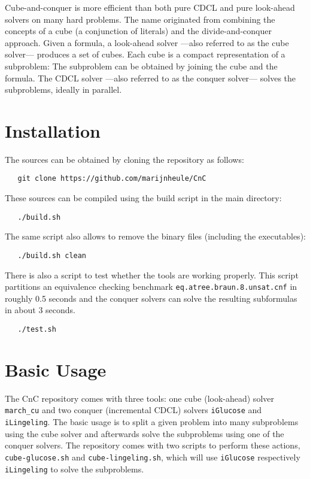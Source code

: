 \documentclass{llncs}
\begin{document}
Cube-and-conquer is more efficient than both pure CDCL and pure look-ahead solvers on many 
hard problems. The name originated from combining the concepts of a cube (a conjunction of literals) and the
divide-and-conquer approach. Given a formula, a look-ahead solver ---also referred to as the cube 
solver--- produces a set of cubes. Each cube is a compact representation of a subproblem:
The subproblem can be obtained by joining the cube and the  formula. The CDCL solver ---also 
referred to as the conquer solver--- solves the subproblems, ideally in parallel.


\section{Installation}

The sources can be obtained by cloning the repository as follows:

\begin{verbatim}
   git clone https://github.com/marijnheule/CnC
\end{verbatim}

\noindent
These sources can be compiled using the build script in the main directory:

\begin{verbatim}
   ./build.sh
\end{verbatim}

\noindent
The same script also allows to remove the binary files (including the executables):

\begin{verbatim}
   ./build.sh clean
\end{verbatim}

\noindent
There is also a script to test whether the tools are working properly. This script
partitions an equivalence checking benchmark {\tt eq.atree.braun.8.unsat.cnf} 
in roughly 0.5 seconds and the conquer solvers can solve the resulting 
subformulas in about 3 seconds.

\begin{verbatim}
   ./test.sh
\end{verbatim}

\section{Basic Usage}
\label{sec:basic}

The CnC repository comes with three tools: one cube (look-ahead) solver 
{\tt march\_cu} and two conquer (incremental CDCL) solvers 
{\tt iGlucose} and {\tt iLingeling}. The basic usage is to split a given 
problem into many subproblems using the cube solver and afterwards
solve the subproblems using one of the conquer solvers. The repository
comes with two scripts to perform these actions, {\tt cube-glucose.sh}
and {\tt cube-lingeling.sh}, which will use {\tt iGlucose} respectively {\tt iLingeling}
to solve the subproblems.
\end{document}
